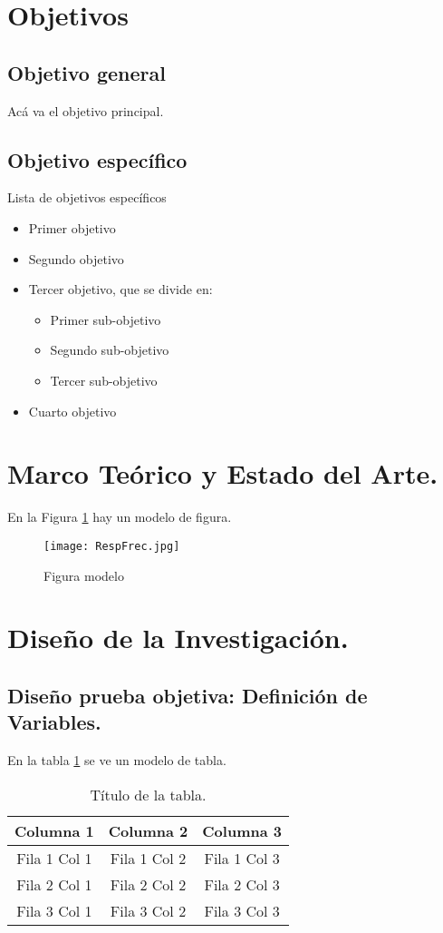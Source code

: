 \section{Objetivos}
\subsection{Objetivo general}
Acá va el objetivo principal.\par
\subsection{Objetivo específico}
Lista de objetivos específicos
\begin{itemize}
\item Primer objetivo
\item Segundo objetivo
\item Tercer objetivo, que se divide en:
	\begin{itemize}
		\item Primer sub-objetivo
		\item Segundo sub-objetivo
		\item Tercer sub-objetivo
	\end{itemize}
\item Cuarto objetivo
\end{itemize}

\section{Marco Teórico y Estado del Arte.}
En la Figura \ref{fig:RespFrec} hay un modelo de figura.

\begin{figure}[h]
	\centering
	\texttt{[image: RespFrec.jpg]}
	\caption[RespFrec]{Figura modelo} 
	\label{fig:RespFrec}
\end{figure}

\section{Diseño de la Investigación.}

\subsection{Diseño prueba objetiva: Definición de Variables.}
En la tabla \ref{tab:HRTFangles} se ve un modelo de tabla.

\begin{table}[h]
	\centering
	\caption{Título de la tabla.}
	\begin{tabular}{ccc}
		\hline
		\textbf{Columna 1}&\textbf{Columna 2}&\textbf{Columna 3}\\\hline
		
		Fila 1 Col 1 & Fila 1 Col 2 & Fila 1 Col 3\\\hline
		Fila 2 Col 1 & Fila 2 Col 2 & Fila 2 Col 3\\\hline
		Fila 3 Col 1 & Fila 3 Col 2 & Fila 3 Col 3\\\hline
	\end{tabular}  
	\label{tab:HRTFangles}
\end{table}

